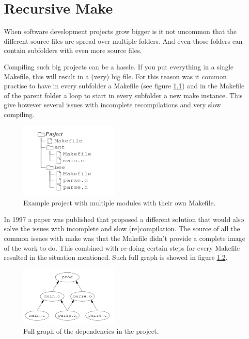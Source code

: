 \chapter{Recursive Make}
\label{chap:rMake}

When software development projects grow bigger is it not uncommon that the different source files are spread over multiple folders. And even those folders can contain subfolders with even more source files.

Compiling such big projects can be a hassle. If you put everything in a single Makefile, this will result in a (very) big file. For this reason was it common practise to have in every subfolder a Makefile (see figure \ref{fig:recmake_project}) and in the Makefile of the parent folder a loop to start in every subfolder a new make instance. This give however several issues with incomplete recompilations and very slow compiling.

 \begin{figure}[H]
  \centering
  \includegraphics[width=5cm]{Images/recmake-project.png}
  \caption{ Example project with multiple modules with their own Makefile.}
  \label{fig:recmake_project}
\end{figure}

In 1997 a paper was published that proposed a different solution that would also solve the issues with incomplete and slow (re)compilation. The source of all the common issues with make was that the Makefile didn't provide a complete image of the work to do. This combined with re-doing certain steps for every Makefile resulted in the situation mentioned. Such full graph is showed in figure \ref{fig:recmake_fullgraph}.

\begin{figure}[H]
  \centering
  \includegraphics[width=5cm]{Images/makerec-fulll-graph.png}
  \caption{ Full graph of the dependencies in the project. }
  \label{fig:recmake_fullgraph}
\end{figure}

